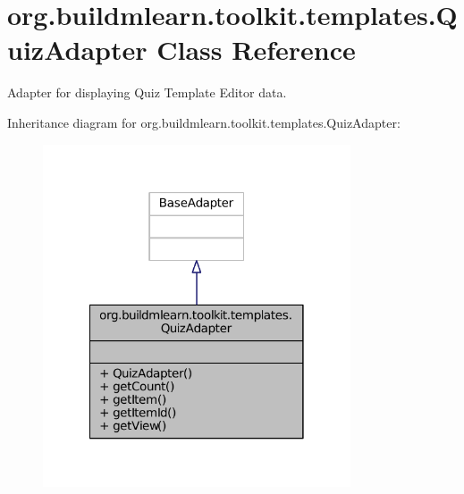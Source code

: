 \hypertarget{classorg_1_1buildmlearn_1_1toolkit_1_1templates_1_1QuizAdapter}{\section{org.\-buildmlearn.\-toolkit.\-templates.\-Quiz\-Adapter Class Reference}
\label{classorg_1_1buildmlearn_1_1toolkit_1_1templates_1_1QuizAdapter}
}


Adapter for displaying Quiz Template Editor data.  




Inheritance diagram for org.\-buildmlearn.\-toolkit.\-templates.\-Quiz\-Adapter\-:
\nopagebreak
\begin{figure}[H]
\begin{center}
\leavevmode
\includegraphics[width=258pt]{d5/dc6/classorg_1_1buildmlearn_1_1toolkit_1_1templates_1_1QuizAdapter__inherit__graph}
\end{center}
\end{figure}


